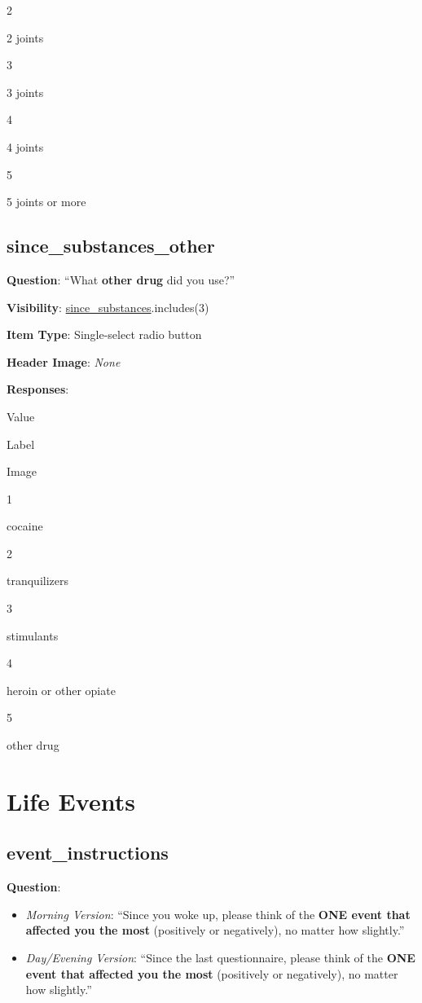 \documentclass[]{book}
\providecommand{\tightlist}{%
  \setlength{\itemsep}{0pt}\setlength{\parskip}{0pt}}
\begin{document}
2

2 joints

3

3 joints

4

4 joints

5

5 joints or more

\hypertarget{since_substances_other}{%
\section{since\_substances\_other}\label{since_substances_other}}

\textbf{Question}: ``What \textbf{other drug} did you use?''

\textbf{Visibility}: \protect\hyperlink{since_substances}{since\_substances}.includes(3)

\textbf{Item Type}: Single-select radio button

\textbf{Header Image}: \emph{None}

\textbf{Responses}:

Value

Label

Image

1

cocaine

2

tranquilizers

3

stimulants

4

heroin or other opiate

5

other drug

\hypertarget{events_section}{%
\chapter{Life Events}\label{events_section}}

\hypertarget{event_instructions}{%
\section{event\_instructions}\label{event_instructions}}

\textbf{Question}:

\begin{itemize}
\tightlist
\item
  \emph{Morning Version}: ``Since you woke up, please think of the \textbf{ONE event that affected you the most} (positively or negatively), no matter how slightly.''
\item
  \emph{Day/Evening Version}: ``Since the last questionnaire, please think of the \textbf{ONE event that affected you the most} (positively or negatively), no matter how slightly.''
\end{itemize}
\end{document}
